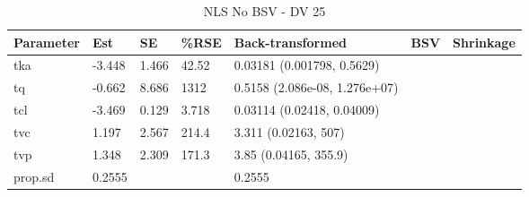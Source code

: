 \begin{table}
\centering\centering
\caption{NLS No BSV - DV 25}
\centering
\fontsize{8}{10}\selectfont
\begin{tabular}[t]{lllllll}
\toprule
\textbf{Parameter} & \textbf{Est} & \textbf{SE} & \textbf{\%RSE} & \textbf{Back-transformed} & \textbf{BSV} & \textbf{Shrinkage}\\
\midrule
tka & -3.448 & 1.466 & 42.52 & 0.03181 (0.001798, 0.5629) &  & \\
\midrule
tq & -0.662 & 8.686 & 1312 & 0.5158 (2.086e-08, 1.276e+07) &  & \\
\midrule
tcl & -3.469 & 0.129 & 3.718 & 0.03114 (0.02418, 0.04009) &  & \\
\midrule
tvc & 1.197 & 2.567 & 214.4 & 3.311 (0.02163, 507) &  & \\
\midrule
tvp & 1.348 & 2.309 & 171.3 & 3.85 (0.04165, 355.9) &  & \\
\midrule
prop.sd & 0.2555 &  &  & 0.2555 &  & \\
\bottomrule
\end{tabular}
\end{table}